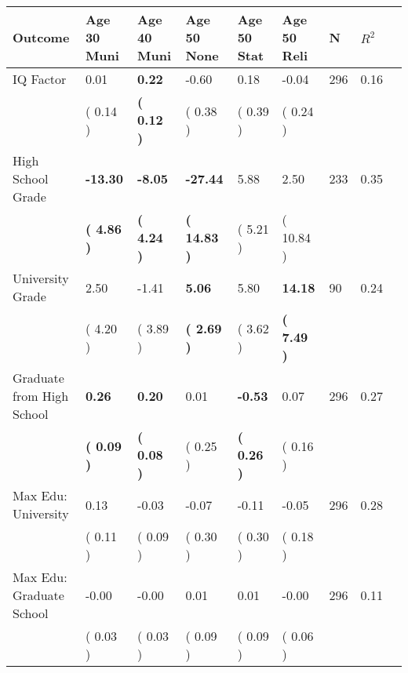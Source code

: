 \begin{tabular}{L{6.2cm} C{1.8cm} C{1.8cm} C{1.8cm} C{1.8cm} C{1.8cm} C{1.8cm} C{0.3cm} C{0.3cm}}
\toprule
 \textbf{Outcome} & \textbf{Age 30 Muni} & \textbf{Age 40 Muni} & \textbf{Age 50 None} & \textbf{Age 50 Stat} & \textbf{Age 50 Reli} & \textbf{N} & \textbf{$ R^2$} \\
\midrule
IQ Factor &      0.01 & \textbf{     0.22} &     -0.60 &      0.18 &     -0.04  & 296 &       0.16 \\ 
 & (     0.14 ) & \textbf{(     0.12 )} & (     0.38 ) & (     0.39 ) & (     0.24 )  & \\
High School Grade & \textbf{   -13.30} & \textbf{    -8.05} & \textbf{   -27.44} &      5.88 &      2.50  & 233 &       0.35 \\ 
 & \textbf{(     4.86 )} & \textbf{(     4.24 )} & \textbf{(    14.83 )} & (     5.21 ) & (    10.84 )  & \\
University Grade &      2.50 &     -1.41 & \textbf{     5.06} &      5.80 & \textbf{    14.18}  & 90 &       0.24 \\ 
 & (     4.20 ) & (     3.89 ) & \textbf{(     2.69 )} & (     3.62 ) & \textbf{(     7.49 )}  & \\
Graduate from High School & \textbf{     0.26} & \textbf{     0.20} &      0.01 & \textbf{    -0.53} &      0.07  & 296 &       0.27 \\ 
 & \textbf{(     0.09 )} & \textbf{(     0.08 )} & (     0.25 ) & \textbf{(     0.26 )} & (     0.16 )  & \\
Max Edu: University &      0.13 &     -0.03 &     -0.07 &     -0.11 &     -0.05  & 296 &       0.28 \\ 
 & (     0.11 ) & (     0.09 ) & (     0.30 ) & (     0.30 ) & (     0.18 )  & \\
Max Edu: Graduate School &     -0.00 &     -0.00 &      0.01 &      0.01 &     -0.00  & 296 &       0.11 \\ 
 & (     0.03 ) & (     0.03 ) & (     0.09 ) & (     0.09 ) & (     0.06 )  & \\
\bottomrule
\end{tabular}
